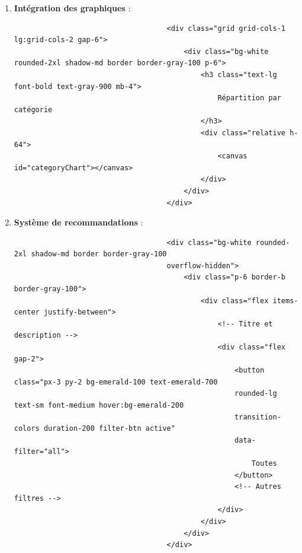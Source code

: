 \documentclass[a4paper,11pt]{article}
\begin{document}
\begin{enumerate}
                        \item \textbf{Intégration des graphiques} :
                            \begin{tcolorbox}[colback=lightgray!6, colframe=black, left=-70mm, right=5mm, top=2mm, bottom=0mm, boxrule=0.1mm]
                                \begin{verbatim}
                                    <div class="grid grid-cols-1 lg:grid-cols-2 gap-6">
                                        <div class="bg-white rounded-2xl shadow-md border border-gray-100 p-6">
                                            <h3 class="text-lg font-bold text-gray-900 mb-4">
                                                Répartition par catégorie
                                            </h3>
                                            <div class="relative h-64">
                                                <canvas id="categoryChart"></canvas>
                                            </div>
                                        </div>
                                    </div>
                                \end{verbatim}
                            \end{tcolorbox}

                        \item \textbf{Système de recommandations} :
                            \begin{tcolorbox}[colback=lightgray!6, colframe=black, left=-70mm, right=5mm, top=2mm, bottom=0mm, boxrule=0.1mm]
                                \begin{verbatim}
                                    <div class="bg-white rounded-2xl shadow-md border border-gray-100 
                                    overflow-hidden">
                                        <div class="p-6 border-b border-gray-100">
                                            <div class="flex items-center justify-between">
                                                <!-- Titre et description -->
                                                <div class="flex gap-2">
                                                    <button class="px-3 py-2 bg-emerald-100 text-emerald-700 
                                                    rounded-lg text-sm font-medium hover:bg-emerald-200 
                                                    transition-colors duration-200 filter-btn active" 
                                                    data-filter="all">
                                                        Toutes
                                                    </button>
                                                    <!-- Autres filtres -->
                                                </div>
                                            </div>
                                        </div>
                                    </div>
                                \end{verbatim}
                            \end{tcolorbox}


\end{enumerate}
\end{document}
